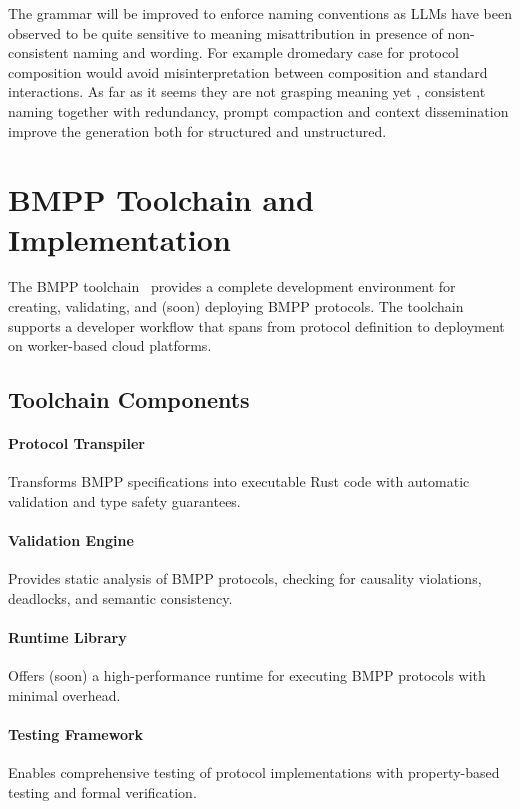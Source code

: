 \documentclass[11pt,a4paper]{article}
\begin{document}
	\noindent The grammar will be improved to enforce naming conventions as LLMs have been observed to be quite sensitive to meaning misattribution in presence of non-consistent naming and wording. For example dromedary case for protocol composition would avoid misinterpretation between composition and standard interactions. As far as it seems they are not grasping meaning yet \cite{dentella2024testing}, consistent naming together with redundancy, prompt compaction and context dissemination improve the generation both for structured and unstructured.
	
	\section{BMPP Toolchain and Implementation}
	\label{sec:implementation}
	
	The BMPP toolchain~\cite{bmpp-agents-rs} provides a complete development environment for creating, validating, and (soon) deploying BMPP protocols. The toolchain supports a developer workflow that spans from protocol definition to deployment on worker-based cloud platforms.
	
	\subsection{Toolchain Components}
	\label{subsec:toolchain}
	
	\paragraph{Protocol Transpiler} Transforms BMPP specifications into executable Rust code with automatic validation and type safety guarantees.
	
	\paragraph{Validation Engine} Provides static analysis of BMPP protocols, checking for causality violations, deadlocks, and semantic consistency.
	
	\paragraph{Runtime Library} Offers (soon) a high-performance runtime for executing BMPP protocols with minimal overhead.
	
	\paragraph{Testing Framework} Enables comprehensive testing of protocol implementations with property-based testing and formal verification.
	
\end{document}
